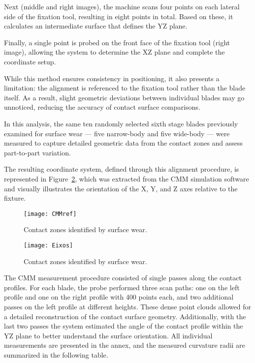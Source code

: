 Next (middle and right images), the machine scans four points on each lateral side of the fixation tool, resulting in eight points in total. Based on these, it calculates an intermediate surface that defines the YZ plane.

Finally, a single point is probed on the front face of the fixation tool (right image), allowing the system to determine the XZ plane and complete the coordinate setup.

While this method ensures consistency in positioning, it also presents a limitation: the alignment is referenced to the fixation tool rather than the blade itself. As a result, slight geometric deviations between individual blades may go unnoticed, reducing the accuracy of contact surface comparisons.

In this analysis, the same ten randomly selected sixth stage blades previously examined for surface wear — five narrow-body and five wide-body — were measured to capture detailed geometric data from the contact zones and assess part-to-part variation.

The resulting coordinate system, defined through this alignment procedure, is represented in Figure~\ref{fig:Eixos}, which was extracted from the CMM simulation software and visually illustrates the orientation of the X, Y, and Z axes relative to the fixture.


\begin{figure}[H]
    \centering
    \texttt{[image: CMMref]}
    \caption{Contact zones identified by surface wear.}
    \label{fig:CMMref}
\end{figure}

\begin{figure}[H]
    \centering
    \texttt{[image: Eixos]}
    \caption{Contact zones identified by surface wear.}
    \label{fig:Eixos}
\end{figure}

The CMM measurement procedure consisted of single passes along the contact profiles. For each blade, the probe performed three scan paths: one on the left profile and one on the right profile with 400 points each, and two additional passes on the left profile at different heights. These dense point clouds allowed for a detailed reconstruction of the contact surface geometry.
Additionally, with the last two passes the system estimated the angle of the contact profile within the YZ plane to better understand the surface orientation. All individual measurements are presented in the annex, and the measured curvature radii are summarized in the following table.

